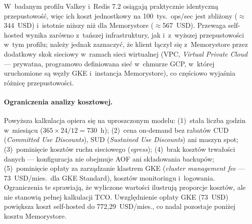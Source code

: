 W~badanym profilu Valkey i~Redis 7.2 osiągają praktycznie identyczną przepustowość, więc ich koszt jednostkowy na 100~tys.\ ops/sec jest zbliżony ($\approx$344~USD) i~istotnie niższy niż dla Memorystore ($\approx$567~USD). Przewaga self-hosted wynika zarówno z~tańszej infrastruktury, jak i~z~wyższej przepustowości w~tym profilu; należy jednak zaznaczyć, że klient łączył się z~Memorystore przez dodatkowy skok sieciowy w~ramach sieci wirtualnej (VPC, \textit{Virtual Private Cloud} --- prywatna, programowo definiowana sieć w~chmurze GCP, w~której uruchomione są węzły GKE i~instancja Memorystore), co częściowo wyjaśnia różnicę przepustowości.

\paragraph{Ograniczenia analizy kosztowej.}
Powyższa kalkulacja opiera się na uproszczonym modelu: (1)~stała liczba godzin w~miesiącu ($365 \times 24 / 12 = 730$~h); (2)~cena on-demand bez rabatów CUD (\textit{Committed Use Discounts}), SUD (\textit{Sustained Use Discounts}) ani maszyn spot; (3)~pominięcie kosztów ruchu sieciowego (\textit{egress}); (4)~brak kosztów trwałości danych --- konfiguracja nie obejmuje AOF ani składowania backupów; (5)~pominięcie opłaty za zarządzanie klastrem GKE (\textit{cluster management fee} --- 73~USD/mies.\ dla GKE Standard), kosztów monitoringu i~logowania. Ograniczenia te sprawiają, że wyliczone wartości ilustrują proporcje kosztów, ale nie stanowią pełnej kalkulacji TCO. Uwzględnienie opłaty GKE (73~USD) powiększa koszt self-hosted do 772{,}29~USD/mies., co nadal pozostaje poniżej kosztu Memorystore.
